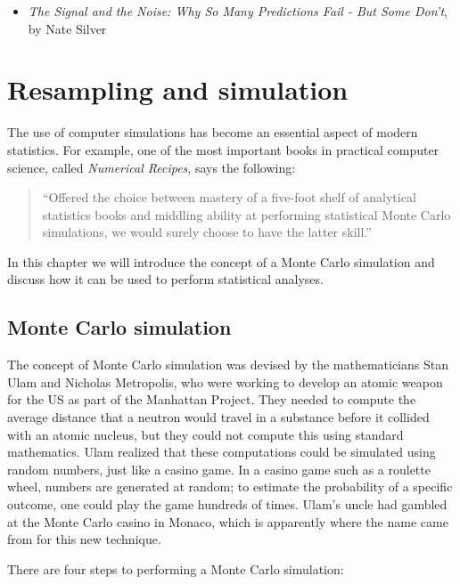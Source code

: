 \documentclass[
  12pt,
]{book}
\providecommand{\tightlist}{%
  \setlength{\itemsep}{0pt}\setlength{\parskip}{0pt}}
\begin{document}
\begin{itemize}
\tightlist
\item
  \emph{The Signal and the Noise: Why So Many Predictions Fail - But Some Don't}, by Nate Silver
\end{itemize}

\hypertarget{resampling-and-simulation}{%
\chapter{Resampling and simulation}\label{resampling-and-simulation}}

The use of computer simulations has become an essential aspect of modern statistics. For example, one of the most important books in practical computer science, called \emph{Numerical Recipes}, says the following:

\begin{quote}
``Offered the choice between mastery of a five-foot shelf of analytical statistics books and middling ability at performing statistical Monte Carlo simulations, we would surely choose to have the latter skill.''
\end{quote}

In this chapter we will introduce the concept of a Monte Carlo simulation and discuss how it can be used to perform statistical analyses.

\hypertarget{monte-carlo-simulation}{%
\section{Monte Carlo simulation}\label{monte-carlo-simulation}}

The concept of Monte Carlo simulation was devised by the mathematicians Stan Ulam and Nicholas Metropolis, who were working to develop an atomic weapon for the US as part of the Manhattan Project. They needed to compute the average distance that a neutron would travel in a substance before it collided with an atomic nucleus, but they could not compute this using standard mathematics.
Ulam realized that these computations could be simulated using random numbers, just like a casino game. In a casino game such as a roulette wheel, numbers are generated at random; to estimate the probability of a specific outcome, one could play the game hundreds of times. Ulam's uncle had gambled at the Monte Carlo casino in Monaco, which is apparently where the name came from for this new technique.

There are four steps to performing a Monte Carlo simulation:
\end{document}
